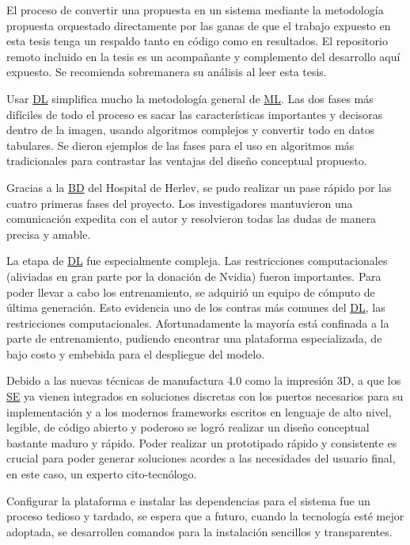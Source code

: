 El proceso de convertir una propuesta en un sistema mediante la metodología
propuesta orquestado directamente por las ganas de que el trabajo expuesto en
esta tesis tenga un respaldo tanto en código como en resultados. El repositorio
remoto incluido en la tesis es un acompañante y complemento del desarrollo aquí
expuesto. Se recomienda sobremanera su análisis al leer esta tesis.

Usar \hyperlink{abbr}{DL} simplifica mucho la metodología general de
\hyperlink{abbr}{ML}. Las dos fases más difíciles de todo el proceso es sacar
las características importantes y decisoras dentro de la imagen, usando
algoritmos complejos y convertir todo en datos tabulares. Se dieron ejemplos de
las fases para el uso en algoritmos más tradicionales para contrastar las
ventajas del diseño conceptual propuesto.

Gracias a la \hyperlink{abbr}{BD} del Hospital de Herlev, se pudo realizar un
pase rápido por las cuatro primeras fases del proyecto. Los investigadores
mantuvieron una comunicación expedita con el autor y resolvieron todas las dudas
de manera precisa y amable. 

La etapa de \hyperlink{abbr}{DL} fue especialmente compleja. Las restricciones
computacionales (aliviadas en gran parte por la donación de Nvidia) fueron
importantes. Para poder llevar a cabo los entrenamiento, se adquirió un equipo
de cómputo de última generación. Esto evidencia uno de los contras más comunes
del \hyperlink{abbr}{DL}, las restricciones computacionales. Afortunadamente la
mayoría está confinada a la parte de entrenamiento, pudiendo encontrar una
plataforma especializada, de bajo costo y embebida para el despliegue del
modelo.

Debido a las nuevas técnicas de manufactura 4.0 como la impresión 3D, a que los
\hyperlink{abbr}{SE} ya vienen integrados en soluciones discretas con los
puertos necesarios para su implementación y a los modernos frameworks escritos
en lenguaje de alto nivel, legible, de código abierto y poderoso se logró
realizar un diseño conceptual bastante maduro y rápido. Poder realizar un
prototipado rápido y consistente es crucial para poder generar soluciones
acordes a las necesidades del usuario final, en este caso, un experto
cito-tecnólogo.

Configurar la plataforma e instalar las dependencias para el sistema fue un
proceso tedioso y tardado, se espera que a futuro, cuando la tecnología esté
mejor adoptada, se desarrollen comandos para la instalación sencillos y
transparentes. 

